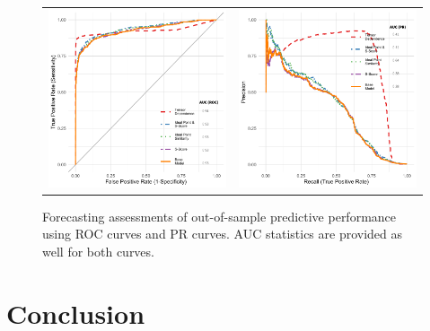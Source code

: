 \documentclass[12pt,pdflatex]{elsarticle}
\begin{document}
\begin{figure}[ht]
	\centering
	\begin{tabular}{cc}
	\includegraphics[width=.4\textwidth]{roc_outSample_time2} &
	\includegraphics[width=.4\textwidth]{rocPr_outSample_time2}
	\end{tabular}
	\caption{Forecasting assessments of out-of-sample predictive performance using ROC curves and PR curves. AUC statistics are provided as well for both curves.}
	\label{fig:rocTime}
\end{figure}
\FloatBarrier

\section*{Conclusion}
\end{document}
